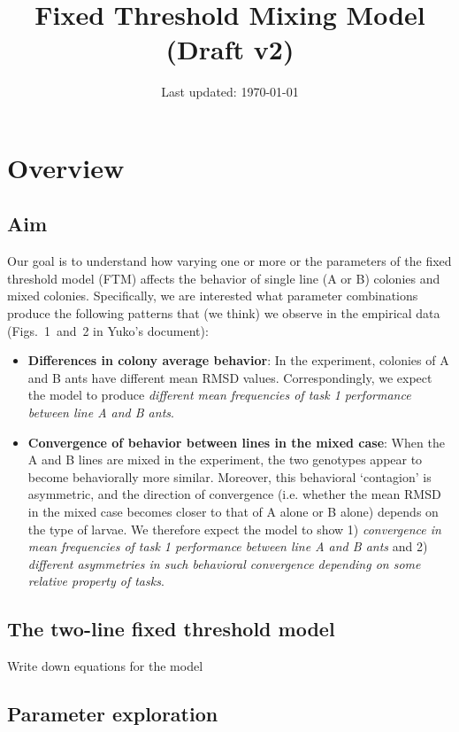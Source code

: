 \documentclass[11pt]{article}
\title{Fixed Threshold Mixing Model ({\color{red}Draft v2})}
\author{\hspace{0pt}\vspace{-30pt}}
\date{Last updated: \today}
\begin{document}
\maketitle
\tableofcontents

\newpage
\section{Overview}

\subsection{Aim}
Our goal is to understand how varying one or more or the parameters of the fixed threshold model (FTM) affects the behavior of single line (A or B) colonies and mixed colonies. Specifically, we are interested what parameter combinations produce the following patterns that (we think) we observe in the empirical data (Figs.~1~and~2 in Yuko's document):

\begin{itemize}
    \item \textbf{Differences in colony average behavior}: 
    In the experiment, colonies of A and B ants have different mean RMSD values. Correspondingly, we expect the model to produce \textit{different mean frequencies of task 1 performance between line A and B ants}.

    \item \textbf{Convergence of behavior between lines in the mixed case}:
    When the A and B lines are mixed in the experiment, the two genotypes appear to become behaviorally more similar. Moreover, this behavioral `contagion' is asymmetric, and the direction of convergence (i.e. whether the mean RMSD in the mixed case becomes closer to that of A alone or B alone) depends on the type of larvae. We therefore expect the model to show 1) \textit{convergence in mean frequencies of task 1 performance between line A and B ants} and 2) \textit{different asymmetries in such behavioral convergence depending on some relative property of tasks}.
    
\end{itemize}

\subsection{The two-line fixed threshold model}
{\color{red}Write down equations for the model}

\subsection{Parameter exploration}
\end{document}
